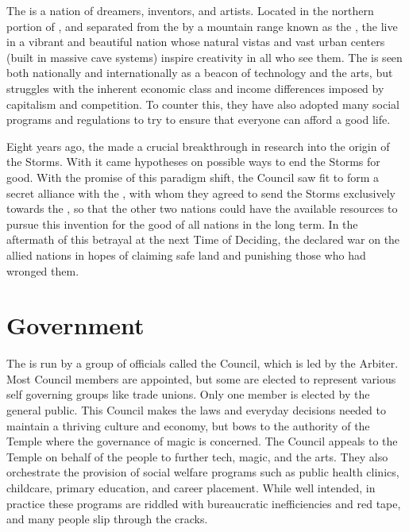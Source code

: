 \documentclass[blue]{GL2020}
\begin{document}
\name{\bTech{}}

The \pTech{} is a nation of dreamers, inventors, and artists. Located in the northern portion of \pEarth{}, and separated from the \pFarm{} by a mountain range known as the \pSpine{}, the \pTechies{} live in a vibrant and beautiful nation whose natural vistas and vast urban centers (built in massive cave systems) inspire creativity in all who see them. The \pTech{} is seen both nationally and internationally as a beacon of technology and the arts, but struggles with the inherent economic class and income differences imposed by capitalism and competition. To counter this, they have also adopted many social programs and regulations to try to ensure that everyone can afford a good life. 

Eight years ago, the \pTechies{} made a crucial breakthrough in research into the origin of the Storms. With it came hypotheses on possible ways to end the Storms for good. With the promise of this paradigm shift, the Council saw fit to form a secret alliance with the \pFarm{}, with whom they agreed to send the Storms exclusively towards the \pShippies{}, so that the other two nations could have the available resources to pursue this invention for the good of all nations in the long term. In the aftermath of this betrayal at the next Time of Deciding, the \pShip{} declared war on the allied nations in hopes of claiming safe land and punishing those who had wronged them.

\section*{Government}
The \pTech{} is run by a group of officials called the Council, which is led by the Arbiter. Most Council members are appointed, but some are elected to represent various self governing groups like trade unions. Only one member is elected by the general public. This Council makes the laws and everyday decisions needed to maintain a thriving culture and economy, but bows to the authority of the Temple where the governance of magic is concerned. The Council appeals to the Temple on behalf of the people to further tech, magic, and the arts. They also orchestrate the provision of social welfare programs such as public health clinics, childcare, primary education, and career placement. While well intended, in practice these programs are riddled with bureaucratic inefficiencies and red tape, and many people slip through the cracks.
\end{document}
